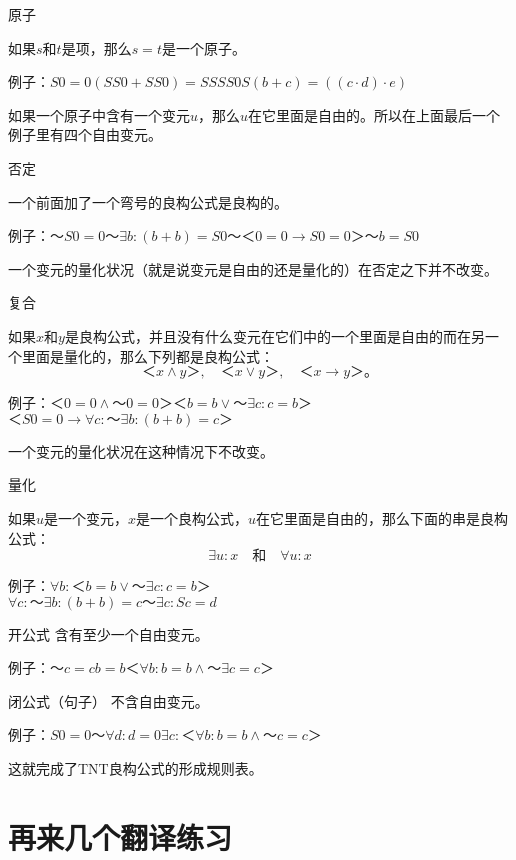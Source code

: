 \begin{rulelist}
\item[原子]\indent

如果$s$和$t$是项，那么$s=t$是一个原子。

例子：$S0=0$\quad$(SS0+SS0)=SSSS0$\quad$S(b+c)=((c\cdot d)\cdot e)$

如果一个原子中含有一个变元$u$，那么$u$在它里面是自由的。所以在上面最后一个例子里有四个自由变元。

\item[否定]\indent

一个前面加了一个弯号的良构公式是良构的。

例子：$～S0=0$\quad$～\exists b:(b+b)=S0$\quad$～＜0=0→S0=0＞～b=S0$

一个变元的量化状况（就是说变元是自由的还是量化的）在否定之下并不改变。

\item[复合]\indent

如果$x$和$y$是良构公式，并且没有什么变元在它们中的一个里面是自由的而在另一个里面是量化的，那么下列都是良构公式：
\[
＜x∧y＞,\quad ＜x∨y＞,\quad ＜x→y＞\text{。}
\]

例子：$＜0=0∧～0=0＞$\quad $＜b=b∨～\exists c:c=b＞$\\
\hspace*{3em}$＜S0=0→\forall c:～\exists b:(b+b)=c＞$

一个变元的量化状况在这种情况下不改变。

\item[量化]\indent

如果$u$是一个变元，$x$是一个良构公式，$u$在它里面是自由的，那么下面的串是良构公式：
\[
\exists u:x\quad \text{和}\quad \forall u:x
\]

例子：$\forall b:＜b=b∨～\exists c:c=b＞$\\
\hspace*{3em}$\forall c:～\exists b:(b+b)=c～\exists c:Sc=d$

\item[开公式]含有至少一个自由变元。

例子：$～c=c$\quad$b=b$\quad$＜\forall b:b=b∧～\exists c=c＞$

\item[闭公式（句子）]不含自由变元。

例子：$S0=0$\quad$～\forall d:d=0$\quad$\exists c:＜\forall b:b=b∧～c=c＞$

\end{rulelist}
这就完成了TNT良构公式的形成规则表。

\section{再来几个翻译练习}

